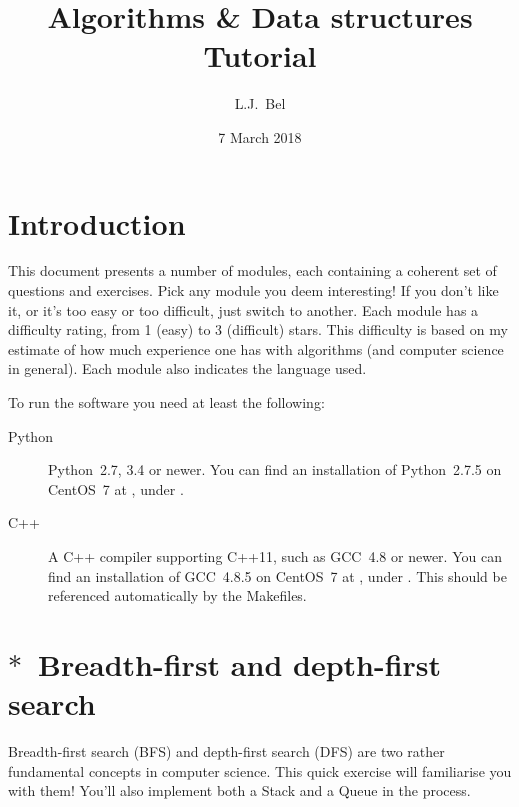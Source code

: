 \documentclass[12pt]{article}
\title{{Algorithms \& Data structures}\\{\large Tutorial}}
\author{L.J.~Bel}
\date{7 March 2018}
\begin{document}
\maketitle

\section*{Introduction}

This document presents a number of modules, each containing a coherent set of questions and exercises. Pick any module you deem interesting! If you don't like it, or it's too easy or too difficult, just switch to another. Each module has a difficulty rating, from 1 (easy) to 3 (difficult) stars. This difficulty is based on my estimate of how much experience one has with algorithms (and computer science in general). Each module also indicates the language used.

To run the software you need at least the following:
\begin{description}
    \item[Python] Python~2.7, 3.4 or newer. You can find an installation of Python~2.7.5 on CentOS~7 at , under .
    \item[C++] A C++ compiler supporting C++11, such as GCC~4.8 or newer. You can find an installation of GCC~4.8.5 on CentOS~7 at , under . This should be referenced automatically by the Makefiles.
\end{description}

\clearpage
\tableofcontents

\clearpage
\section{$\ast$~Breadth-first and depth-first search}

Breadth-first search (BFS) and depth-first search (DFS) are two rather fundamental concepts in computer science. This quick exercise will familiarise you with them! You'll also implement both a Stack and a Queue in the process.
\end{document}
